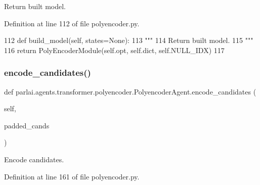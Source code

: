 \begin{DoxyVerb}Return built model.
\end{DoxyVerb}
 

Definition at line 112 of file polyencoder.\+py.


\begin{DoxyCode}
112     \textcolor{keyword}{def }build\_model(self, states=None):
113         \textcolor{stringliteral}{"""}
114 \textcolor{stringliteral}{        Return built model.}
115 \textcolor{stringliteral}{        """}
116         \textcolor{keywordflow}{return} PolyEncoderModule(self.opt, self.dict, self.NULL\_IDX)
117 
\end{DoxyCode}
\mbox{\label{classparlai_1_1agents_1_1transformer_1_1polyencoder_1_1PolyencoderAgent_ae73fe8d98b46a7ef18ef7115f29c999d}} 
\subsubsection{\texorpdfstring{encode\+\_\+candidates()}{encode\_candidates()}}
{\footnotesize\ttfamily def parlai.\+agents.\+transformer.\+polyencoder.\+Polyencoder\+Agent.\+encode\+\_\+candidates (\begin{DoxyParamCaption}\item[{}]{self,  }\item[{}]{padded\+\_\+cands }\end{DoxyParamCaption})}

\begin{DoxyVerb}Encode candidates.
\end{DoxyVerb}
 

Definition at line 161 of file polyencoder.\+py.


